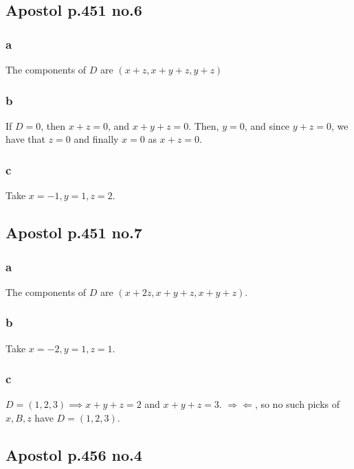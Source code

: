 \documentclass[12pt,letterpaper]{article}
\theoremstyle{definition}
\newcommand{\contra}{\Rightarrow\!\Leftarrow}
\begin{document}
\subsection*{Apostol p.451 no.6}

\subsubsection*{a}

The components of $D$ are $(x + z, x + y + z, y + z)$

\subsubsection*{b}

If $D = 0$, then $x + z = 0$, and $ x + y + z = 0$. Then, $y = 0$, and since $y
+ z = 0$, we have that $z = 0$ and finally $x = 0$ as $x + z = 0$. 

\subsubsection*{c}

Take $x = -1, y = 1, z = 2$.

\subsection*{Apostol p.451 no.7}

\subsubsection*{a}

The components of $D$ are $(x + 2z, x + y + z, x + y + z)$.

\subsubsection*{b}

Take $x = -2, y = 1, z = 1$.

\subsubsection*{c}

$D = (1, 2, 3) \implies x + y + z = 2$ and $x + y + z = 3$. $\contra$, so no
such picks of $x, B, z$ have $D = (1, 2, 3)$.

\subsection*{Apostol p.456 no.4}
\end{document}
